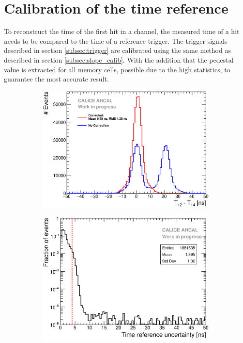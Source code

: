 \section{Calibration of the time reference}
\label{section:time_ref}

To reconstruct the time of the first hit in a channel, the measured time of a hit needs to be compared to the time of a reference trigger. The trigger signals described in section \ref{subsec:trigger} are calibrated using the same method as described in section \ref{subsec:slope_calib}. With the addition that the pedestal value is extracted for all memory cells, possible due to the high statistics, to guarantee the most accurate result.

\begin{figure}[htbp!]
	\begin{subfigure}[t]{0.49\textwidth}
		\centering
		\includegraphics[width=1\textwidth]{../Thesis_Plots/Timing/T0s/Plots/T0_Resolution_5.eps}
		\caption{}	\label{fig:T0_Correction}
	\end{subfigure}
	\hfill
	\begin{subfigure}[t]{0.49\textwidth}
		\centering
		\includegraphics[width=1\linewidth]{../Thesis_Plots/Timing/T0s/Plots/T0ReferenceError.eps}

\end{subfigure}
\end{figure}
